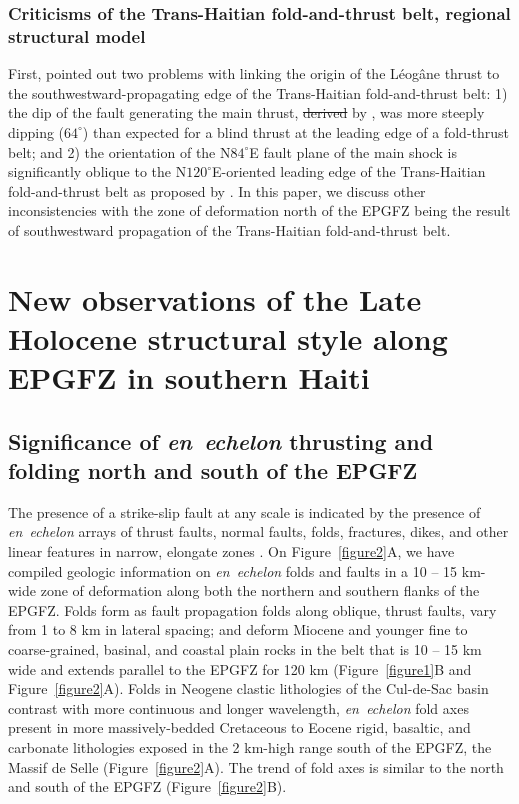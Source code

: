 \documentclass[linenumbers,draft]{agujournal}
\providecommand{\DIFaddtex}[1]{{\protect\color{blue}\uwave{#1}}} %
\providecommand{\DIFdeltex}[1]{{\protect\color{red}\sout{#1}}}                      %
\providecommand{\DIFaddbegin}{} %
\providecommand{\DIFaddend}{} %
\providecommand{\DIFdelbegin}{} %
\providecommand{\DIFdelend}{} %
\providecommand{\DIFadd}[1]{\texorpdfstring{\DIFaddtex{#1}}{#1}} %
\providecommand{\DIFdel}[1]{\texorpdfstring{\DIFdeltex{#1}}{}} %
\begin{document}
\subsubsection{Criticisms of the Trans-Haitian fold-and-thrust belt, regional structural model}
First, \citet{mercier20112010} pointed out two problems with linking the origin of the L\'eog\^ane thrust to the southwestward-propagating edge of the Trans-Haitian fold-and-thrust belt: 1) the dip of the fault generating the main thrust, \DIFdelbegin \DIFdel{derived }\DIFdelend \DIFaddbegin \DIFadd{as imaged }\DIFaddend by \citet{mercier20112010}, was more steeply dipping ($64^{\circ}$) than expected for a blind thrust at the leading edge of a fold-thrust belt; and 2) the orientation of the N$84^{\circ}$E fault plane of the main shock is significantly oblique to the N$120^{\circ}$E-oriented leading edge of the Trans-Haitian fold-and-thrust belt as proposed by \citet{pubellier2000plate}. In this paper, we discuss other inconsistencies with the zone of deformation north of the EPGFZ being the result of southwestward propagation of the Trans-Haitian fold-and-thrust belt.

\section{New observations of the Late Holocene structural style along EPGFZ in southern Haiti}
\subsection{Significance of \textit{en~echelon} thrusting and folding north and south of the EPGFZ}
The presence of a strike-slip fault at any scale is indicated by the presence of \textit{en~echelon} arrays of thrust faults, normal faults, folds, fractures, dikes, and other linear features in narrow, elongate zones \citep{sylvester1988strike}. On Figure~\ref{figure2}A, we have compiled geologic information on \textit{en~echelon} folds and faults in a 10 -- 15 km-wide zone of deformation along both the northern and southern flanks of the EPGFZ. Folds form as fault propagation folds along oblique, thrust faults, vary from 1 to 8 km in lateral spacing; and deform Miocene and younger fine to coarse-grained, basinal, and coastal plain rocks in the belt that is 10 -- 15 km wide and extends parallel to the EPGFZ for 120 km (Figure~\ref{figure1}B and Figure~\ref{figure2}A). Folds in Neogene clastic lithologies of the Cul-de-Sac basin contrast with more continuous and longer wavelength, \textit{en~echelon} fold axes present in more massively-bedded Cretaceous to Eocene rigid, basaltic, and carbonate lithologies exposed in the 2 km-high range south of the EPGFZ, the Massif de Selle (Figure~\ref{figure2}A). The \DIFaddbegin \DIFadd{curvilinear }\DIFaddend trend of fold axes is similar \DIFaddbegin \DIFadd{both }\DIFaddend to the north and south of the EPGFZ (Figure~\ref{figure2}B). 
\end{document}
